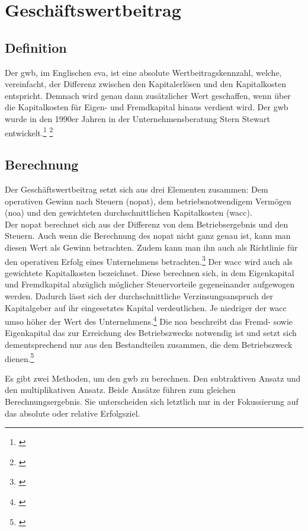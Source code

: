 \chapter{Geschäftswertbeitrag}
\label{Geschaeftswertbeitrag}

\section{Definition}

Der \ac{gwb}, im Englischen \ac{eva}, ist eine absolute Wertbeitragskennzahl, welche, vereinfacht, der Differenz zwischen den Kapitalerlösen und den Kapitalkosten entspricht. Demnach wird genau dann zusätzlicher Wert geschaffen, wenn über die Kapitalkosten für Eigen- und Fremdkapital hinaus verdient wird. Der \ac{gwb} wurde in den 1990er Jahren in der Unternehmensberatung Stern Stewart entwickelt.\footnote{\cite{wikipedia-eva}} \footnote{\cite{controlling-eva}}

\section{Berechnung}

Der Geschäftswertbeitrag setzt sich aus drei Elementen zusammen: Dem operativen Gewinn nach Steuern (\ac{nopat}), dem betriebsnotwendigem Vermögen (\ac{noa}) und den gewichteten durchschnittlichen Kapitalkosten (\ac{wacc}).\\

\noindent
Der \ac{nopat} berechnet sich aus der Differenz von dem Betriebsergebnis und den Steuern. Auch wenn die Berechnung des \ac{nopat} nicht ganz genau ist, kann man diesen Wert als Gewinn betrachten. Zudem kann man ihn auch als Richtlinie für den operativen Erfolg eines Unternehmens betrachten.\footnote{\cite{studyflix-nopat}} Der \ac{wacc} wird auch als gewichtete Kapitalkosten bezeichnet. Diese berechnen sich, in dem Eigenkapital und Fremdkapital abzüglich möglicher Steuervorteile gegeneinander aufgewogen werden. Dadurch lässt sich der durchschnittliche Verzinsungsanspruch der Kapitalgeber auf ihr eingesetztes Kapital verdeutlichen. Je niedriger der \ac{wacc} umso höher der Wert des Unternehmens.\footnote{\cite{studyflix-wacc}} Die \ac{noa} beschreibt das Fremd- sowie Eigenkapital das zur Erreichung des Betriebszwecks notwendig ist und setzt sich dementsprechend nur aus den Bestandteilen zusammen, die dem Betriebszweck dienen.\footnote{\cite{unternehmerinfos-noa}}

\bigskip
\noindent
Es gibt zwei Methoden, um den \ac{gwb} zu berechnen. Den subtraktiven Ansatz und den multiplikativen Ansatz. Beide Ansätze führen zum gleichen Berechnungsergebnis. Sie unterscheiden sich letztlich nur in der Fokussierung auf das absolute oder relative Erfolgsziel.

